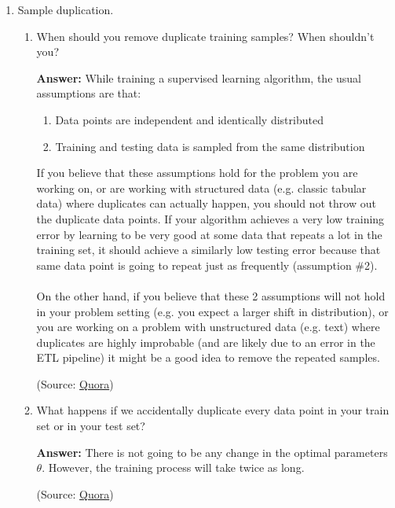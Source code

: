 \documentclass{article}
\newenvironment{QandA}{\begin{enumerate}[label=\arabic*.]}{\end{enumerate}}
\newenvironment{InnerQandA}{\begin{enumerate}[label=\roman*.]}{\end{enumerate}}
\newenvironment{answer}{\par\normalfont \textbf{Answer:}}{}
\begin{document}
\begin{QandA}
    \item Sample duplication.
    \begin{InnerQandA}
        \item When should you remove duplicate training samples? When shouldn’t you?
        \begin{answer}
            While training a supervised learning algorithm, the usual assumptions are that:
            \begin{enumerate}[label=\arabic*.]
                \item Data points are independent and identically distributed
                \item Training and testing data is sampled from the same distribution
            \end{enumerate}

            If you believe that these assumptions hold for the problem you are working on, or are working with structured data (e.g. classic tabular data) where duplicates can actually happen, you should not throw out the duplicate data points. If your algorithm achieves a very low training error by learning to be very good at some data that repeats a lot in the training set, it should achieve a similarly low testing error because that same data point is going to repeat just as frequently (assumption \#2). \\\\
            On the other hand, if you believe that these 2 assumptions will not hold in your problem setting (e.g. you expect a larger shift in distribution), or you are working on a problem with unstructured data (e.g. text) where duplicates are highly improbable (and are likely due to an error in the ETL pipeline) it might be a good idea to remove the repeated samples.

            (Source: \href{https://www.quora.com/Should-we-remove-duplicates-from-a-data-set-while-training-a-Machine-Learning-algorithm-shallow-and-or-deep-methods}{Quora})
        \end{answer}

        \item What happens if we accidentally duplicate every data point in your train set or in your test set?
        \begin{answer}
            There is not going to be any change in the optimal parameters $\theta$. However, the training process will take twice as long.

            (Source: \href{https://www.quora.com/What-happens-if-I-double-the-same-data-that-was-duplicated-for-classification-in-machine-learning-What-kind-of-impact-does-it-have}{Quora})
        \end{answer}
    \end{InnerQandA}


\end{QandA}
\end{document}
